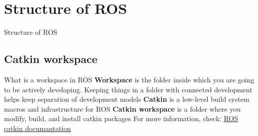 \documentclass{beamer}
\begin{document}

\section{Structure of ROS}
\begin{frame}
\begin{center}
\Huge Structure of ROS
\end{center}
\end{frame}

\subsection{Catkin workspace}
\begin{frame}{What is a workspace in ROS}
\textbf{Workspace} is the folder inside which you are going to be actively developing. Keeping things in a folder with connected development helps keep separation of development models
\vfill
\textbf{Catkin} is a low-level build system macros and infrastructure for ROS
\vfill
\textbf{Catkin workspace} is a folder where you modify, build, and install catkin packages
\vfill
For more information, check: \href{http://wiki.ros.org/catkin}{ROS catkin documantation}
\end{frame}
\end{document}
